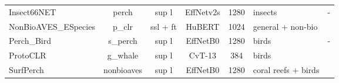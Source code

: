 \begin{table*}[t]
\begin{tabular}{|l|c|c|c|c|l|c|}
    Insect66NET         & perch & sup l & EffNetv2s 	 & 1280& insects & - \\
    NonBioAVES\_ESpecies & p\_clr    & ssl + ft & HuBERT 	 & 1024& general + non-bio & \cite{hagiwara_aves_2022}\\
    Perch\_Bird         & s\_perch   & sup l & EffNetB0 	 & 1280& birds & - \\
    ProtoCLR            & g\_whale   & sup l 	 & CvT-13 & 384 & birds & \cite{moummad_domain-invariant_2024}\\
    SurfPerch           & nonbioaves   & sup l & EffNetB0 	 & 1280& coral reefs + birds & \cite{williams_leveraging_2024}\\
    \hline
  \end{tabular}
\end{table*}
